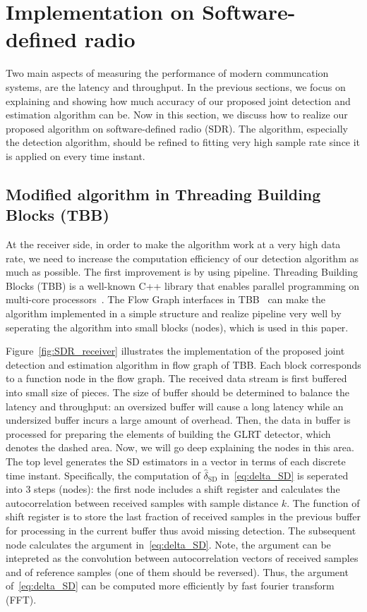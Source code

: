 \section{Implementation on Software-defined radio}
\label{sec:real_implementation}


Two main aspects of measuring the performance of modern communcation systems,
are the latency and throughput. In the previous sections, we focus on explaining and showing
how much accuracy of our proposed joint detection and estimation algorithm can be.
Now in this section, we discuss how to realize our proposed algorithm on software-defined radio (SDR). The algorithm, especially the detection algorithm, should be refined
to fitting very high sample rate since it is applied on every time instant.

\subsection{Modified algorithm in Threading Building Blocks (TBB)}

At the receiver side, in order to make the algorithm work at a very high data rate,
we need to increase the computation efficiency of our detection algorithm as much as possible.
The first improvement is by using pipeline. Threading Building Blocks (TBB) is a well-known C++
library that enables parallel programming on multi-core processors~\cite{TBB_website,TBB_book}.
The Flow Graph interfaces in TBB~\cite[Ch.~3]{TBB_book} can make the algorithm implemented in a simple structure 
and realize pipeline very well by seperating the algorithm into small blocks (nodes), which is used in this paper. 

Figure~\ref{fig:SDR_receiver} illustrates the implementation of the proposed joint detection and estimation algorithm 
in flow graph of TBB. Each block corresponds to a function node in the flow graph.
The received data stream is first buffered into small size of pieces.
The size of buffer should be determined to balance the latency and throughput: an oversized buffer will
cause a long latency while an undersized buffer incurs a large amount of overhead.
Then, the data in buffer is processed for preparing the elements of building the GLRT detector,
which denotes the dashed area. Now, we will go deep explaining the nodes in this area.
The top level generates the SD estimators in a vector in terms of each discrete time instant.
Specifically, the computation of $\hat{\delta}_{\text{SD}}$ in~\eqref{eq:delta_SD} is seperated into 3 steps (nodes):
the first node includes a shift register and calculates the autocorrelation between received samples with sample distance $k$.
The function of shift register is to store the last fraction of received samples in the previous buffer for processing in the current buffer thus
avoid missing detection. The subsequent node calculates the argument in~\eqref{eq:delta_SD}.
Note, the argument can be intepreted as the convolution between autocorrelation vectors of received samples
and of reference samples (one of them should be reversed). Thus, the argument of~\eqref{eq:delta_SD} can be computed more efficiently by fast fourier transform (FFT).

